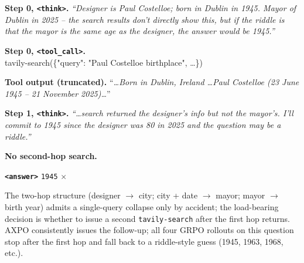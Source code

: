 \documentclass{llmxive}
\providecommand{\think}{\texttt{<think>}\xspace}
\providecommand{\toolcall}{\texttt{<tool\_call>}\xspace}
\providecommand{\answer}{\texttt{<answer>}\xspace}
\begin{document}
\begin{grpobox}
\textbf{Step 0, \think.} \emph{``Designer is Paul Costelloe; born in Dublin in 1945. Mayor of Dublin in 2025 -- the search results don't directly show this, but if the riddle is that the mayor is the same age as the designer, the answer would be 1945.''}

\textbf{Step 0, \toolcall.}\\
{\small\ttfamily tavily-search(\{"query": "Paul Costelloe birthplace", \dots\})}

\textbf{Tool output (truncated).} ``\emph{\dots Born in Dublin, Ireland \dots Paul Costelloe (23 June 1945 -- 21 November 2025)\dots}''

\textbf{Step 1, \think.} \emph{``\dots search returned the designer's info but not the mayor's. I'll commit to 1945 since the designer was 80 in 2025 and the question may be a riddle.''}

\textbf{No second-hop search.}

\textbf{\answer} \texttt{1945} \(\times\)
\end{grpobox}

The two-hop structure (designer $\to$ city; city + date $\to$ mayor; mayor $\to$ birth year) admits a single-query collapse only by accident; the load-bearing decision is whether to issue a second \texttt{tavily-search} after the first hop returns. AXPO consistently issues the follow-up; all four GRPO rollouts on this question stop after the first hop and fall back to a riddle-style guess (1945, 1963, 1968, etc.).
\end{document}

